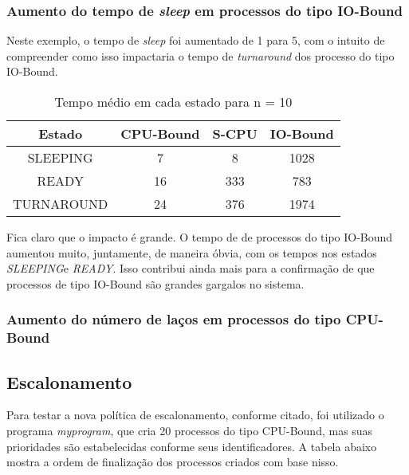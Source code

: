 \documentclass{article}
\begin{document}
\subsubsection{Aumento do tempo de \textit{sleep} em processos do tipo IO-Bound}

Neste exemplo, o tempo de \textit{sleep} foi aumentado de 1 para 5, com o
intuito de compreender como isso impactaria o tempo de \textit{turnaround} dos
processo do tipo IO-Bound.

\begin{table}[H]
      \centering
      \begin{tabular}{|c|c|c|c|}
            \hline
            Estado     & CPU-Bound & S-CPU &
            IO-Bound                              \\
            \hline
            SLEEPING   & 7         & 8     & 1028 \\
            READY      & 16        & 333   & 783  \\
            TURNAROUND & 24        & 376   & 1974 \\
            \hline
      \end{tabular}
      \caption{Tempo médio em cada estado para n = 10}
\end{table}

Fica claro que o impacto é grande. O tempo de  de processos
do tipo IO-Bound aumentou muito, juntamente, de maneira óbvia, com os tempos
nos estados \textit{SLEEPING}e \textit{READY}. Isso contribui ainda mais para a
confirmação de que processos de tipo IO-Bound são grandes gargalos no sistema.

\subsubsection{Aumento do número de laços em processos do tipo CPU-Bound}

\subsection{Escalonamento}

Para testar a nova política de escalonamento, conforme citado, foi utilizado o
programa \textit{myprogram}, que cria 20 processos do tipo
CPU-Bound, mas suas prioridades são estabelecidas conforme seus
identificadores. A tabela abaixo mostra a ordem de finalização dos processos
criados com base nisso.
\end{document}
